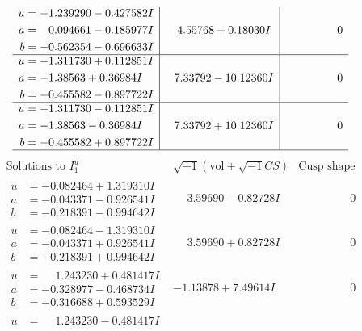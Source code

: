 \documentclass[1p]{elsarticle_modified}
\theoremstyle{definition}
\newcommand{\I}{\sqrt{-1}}
\begin{document}
$$\begin{array}{c|c|c}
\begin{aligned}
u &= -1.239290 - 0.427582 I \\
a &= \phantom{-}0.094661 - 0.185977 I \\
b &= -0.562354 - 0.696633 I\end{aligned}
 & \phantom{-}4.55768 + 0.18030 I & \phantom{-0.000000 } 0 \\ \hline\begin{aligned}
u &= -1.311730 + 0.112851 I \\
a &= -1.38563 + 0.36984 I \\
b &= -0.455582 - 0.897722 I\end{aligned}
 & \phantom{-}7.33792 - 10.12360 I & \phantom{-0.000000 } 0 \\ \hline\begin{aligned}
u &= -1.311730 - 0.112851 I \\
a &= -1.38563 - 0.36984 I \\
b &= -0.455582 + 0.897722 I\end{aligned}
 & \phantom{-}7.33792 + 10.12360 I & \phantom{-0.000000 } 0\\
 \hline 
 \end{array}$$\newpage$$\begin{array}{c|c|c}  
\text{Solutions to }I^u_{1}& \I (\text{vol} + \sqrt{-1}CS) & \text{Cusp shape}\\
 \hline 
\begin{aligned}
u &= -0.082464 + 1.319310 I \\
a &= -0.043371 - 0.926541 I \\
b &= -0.218391 - 0.994642 I\end{aligned}
 & \phantom{-}3.59690 - 0.82728 I & \phantom{-0.000000 } 0 \\ \hline\begin{aligned}
u &= -0.082464 - 1.319310 I \\
a &= -0.043371 + 0.926541 I \\
b &= -0.218391 + 0.994642 I\end{aligned}
 & \phantom{-}3.59690 + 0.82728 I & \phantom{-0.000000 } 0 \\ \hline\begin{aligned}
u &= \phantom{-}1.243230 + 0.481417 I \\
a &= -0.328977 - 0.468734 I \\
b &= -0.316688 + 0.593529 I\end{aligned}
 & -1.13878 + 7.49614 I & \phantom{-0.000000 } 0 \\ \hline\begin{aligned}
u &= \phantom{-}1.243230 - 0.481417 I \\

\end{aligned}
\end{array}$$
\end{document}
